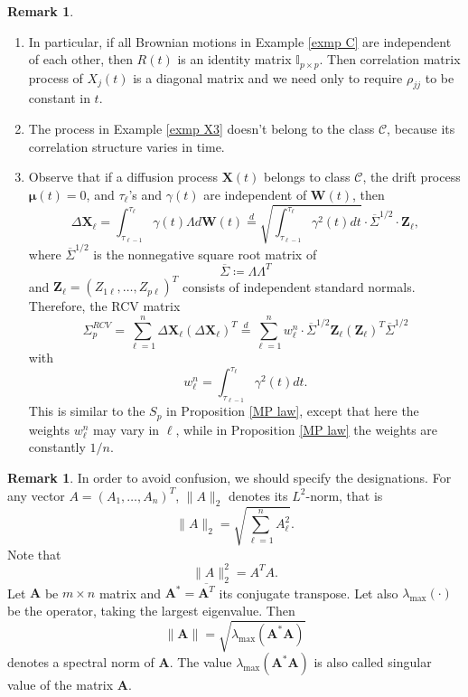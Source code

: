 \documentclass[a4paper,11pt]{book}
\theoremstyle{plain}
\theoremstyle{definition}
\newtheorem{rmrk}[thm]{Remark}
\begin{document}
    \begin{rmrk} \
    	\begin{enumerate}
    		\item In particular, if all Brownian motions in Example \ref{exmp C} are independent of each other, then $R(t)$ is an identity matrix $\mathbb{I}_{p \times p}$. Then correlation matrix process of $X_j(t)$ is a diagonal matrix and we need only to require $\rho_{jj}$ to be constant in $t$. 
    		\item The process in Example \ref{exmp X3} doesn't belong to the class $\mathcal{C}$, because its correlation structure varies in time.
    		\item Observe that if a diffusion process $\mathbf{X}(t)$ belongs to class $\mathcal{C}$, the drift process $\boldsymbol{\mu}(t) = 0$, and $\tau_\ell$'s and $\gamma(t)$ are independent of $\mathbf{W}(t)$, then
    		\[ \Delta \mathbf{X}_\ell = \int_{\tau_{\ell-1}}^{\tau_\ell} \gamma(t) \Lambda d\mathbf{W}(t) \stackrel{d}{=} \sqrt{\int_{\tau_{\ell-1}}^{\tau_\ell} \gamma^2(t)dt} \cdot \overline{\Sigma}^{1/2} \cdot \mathbf{Z}_\ell, \]
    		where $ \overline{\Sigma}^{1/2}$ is the nonnegative square root matrix of
    		\[\overline{\Sigma} \coloneqq \Lambda \Lambda^T \]
    		and $\mathbf{Z}_\ell = (Z_{1\ell}, \dots, Z_{p\ell})^T$ consists of independent standard normals. Therefore, the RCV matrix
    		\[ \Sigma_p^{RCV} = \sum_{\ell=1}^{n} \Delta \mathbf{X}_\ell(\Delta \mathbf{X}_\ell)^T \stackrel{d}{=} \sum_{\ell=1}^{n} w_\ell^n \cdot \overline{\Sigma}^{1/2}\mathbf{Z}_\ell (\mathbf{Z}_\ell)^T \overline{\Sigma}^{1/2} \]
    		with 
    		\[w_\ell^n =\int_{\tau_{\ell-1}}^{\tau_\ell} \gamma^2(t)dt.\]
    		This is similar to the $S_p$ in Proposition \ref{MP law}, except that here the weights $w_\ell^n$ may vary in $\ell$, while in Proposition \ref{MP law} the weights are constantly $1/n$.
    	\end{enumerate}
    \end{rmrk}
    
    \begin{rmrk}
    	In order to avoid confusion, we should specify the designations. For any vector $A = (A_1, \dots, A_n)^T$, $\|A\|_2$ denotes its $L^2$-norm, that is
    	\[ \|A\|_2 = \sqrt{\sum_{\ell=1}^n A_\ell^2 }. \]
    	Note that
    	\[ \|A\|_2^2 = A^T A. \]
    	Let $\mathbf{A}$ be $m \times n$ matrix and $\mathbf{A}^* = \overline{\mathbf{A}^T}$ its conjugate transpose. Let also $\lambda_{\max}(\cdot)$ be the operator, taking the largest eigenvalue. Then
    	\[ \|\mathbf{A} \| = \sqrt{\lambda_{\max} (\mathbf{A}^* \mathbf{A}) } \]
    	denotes a spectral norm of $\mathbf{A}$. The value $\lambda_{\max} (\mathbf{A}^* \mathbf{A})$ is also called singular value of the matrix $\mathbf{A}$.
    \end{rmrk}
    
\end{document}
